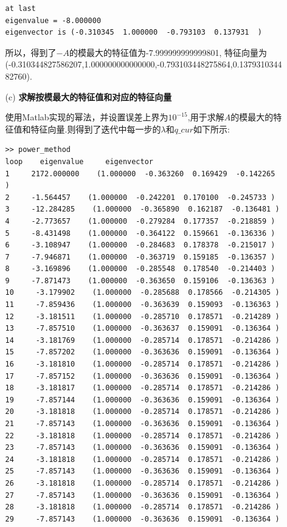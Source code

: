 \documentclass[12pt,a4paper,utf8]{ctexart}
\begin{document}
\begin{enumerate}
\begin{itemize}
\begin{lstlisting}
at last
eigenvalue = -8.000000
eigenvector is (-0.310345  1.000000  -0.793103  0.137931  )    
    \end{lstlisting}
    \par
    所以，得到了$-A$的模最大的特征值为-7.999999999999801,
    特征向量为(-0.310344827586207,1.000000000000000,-0.793103448275864,0.137931034482760).
    \item[(c)] \textbf{求解按模最大的特征值和对应的特征向量}
    \par 
    使用Matlab实现的幂法，并设置误差上界为$10^{-15}$,用于求解$A$的模最大的特征值和特征向量.则得到了迭代中每一步的$\lambda$和$q\_cur$如下所示:
    \begin{lstlisting}
>> power_method
loop    eigenvalue     eigenvector
1     2172.000000    (1.000000  -0.363260  0.169429  -0.142265 )
2     -1.564457    (1.000000  -0.242201  0.170100  -0.245733 )
3     -12.284285    (1.000000  -0.365890  0.162187  -0.136481 )
4     -2.773657    (1.000000  -0.279284  0.177357  -0.218859 )
5     -8.431498    (1.000000  -0.364122  0.159661  -0.136336 )
6     -3.108947    (1.000000  -0.284683  0.178378  -0.215017 )
7     -7.946871    (1.000000  -0.363719  0.159185  -0.136357 )
8     -3.169896    (1.000000  -0.285548  0.178540  -0.214403 )
9     -7.871473    (1.000000  -0.363650  0.159106  -0.136363 )
10     -3.179902    (1.000000  -0.285688  0.178566  -0.214305 )
11     -7.859436    (1.000000  -0.363639  0.159093  -0.136363 )
12     -3.181511    (1.000000  -0.285710  0.178571  -0.214289 )
13     -7.857510    (1.000000  -0.363637  0.159091  -0.136364 )
14     -3.181769    (1.000000  -0.285714  0.178571  -0.214286 )
15     -7.857202    (1.000000  -0.363636  0.159091  -0.136364 )
16     -3.181810    (1.000000  -0.285714  0.178571  -0.214286 )
17     -7.857152    (1.000000  -0.363636  0.159091  -0.136364 )
18     -3.181817    (1.000000  -0.285714  0.178571  -0.214286 )
19     -7.857144    (1.000000  -0.363636  0.159091  -0.136364 )
20     -3.181818    (1.000000  -0.285714  0.178571  -0.214286 )
21     -7.857143    (1.000000  -0.363636  0.159091  -0.136364 )
22     -3.181818    (1.000000  -0.285714  0.178571  -0.214286 )
23     -7.857143    (1.000000  -0.363636  0.159091  -0.136364 )
24     -3.181818    (1.000000  -0.285714  0.178571  -0.214286 )
25     -7.857143    (1.000000  -0.363636  0.159091  -0.136364 )
26     -3.181818    (1.000000  -0.285714  0.178571  -0.214286 )
27     -7.857143    (1.000000  -0.363636  0.159091  -0.136364 )
28     -3.181818    (1.000000  -0.285714  0.178571  -0.214286 )
29     -7.857143    (1.000000  -0.363636  0.159091  -0.136364 )

\end{lstlisting}
\end{itemize}
\end{enumerate}
\end{document}
